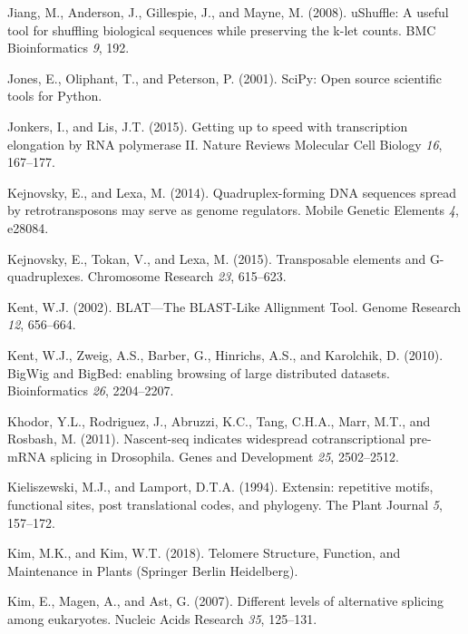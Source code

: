\documentclass[12pt,a4paper,]{report}
\begin{document}
\leavevmode\hypertarget{ref-Jiang2008}{}%
Jiang, M., Anderson, J., Gillespie, J., and Mayne, M. (2008). uShuffle:
A useful tool for shuffling biological sequences while preserving the
k-let counts. BMC Bioinformatics \emph{9}, 192.

\leavevmode\hypertarget{ref-Jones2001}{}%
Jones, E., Oliphant, T., and Peterson, P. (2001). SciPy: Open source
scientific tools for Python.

\leavevmode\hypertarget{ref-Jonkers2015}{}%
Jonkers, I., and Lis, J.T. (2015). Getting up to speed with
transcription elongation by RNA polymerase II. Nature Reviews Molecular
Cell Biology \emph{16}, 167--177.

\leavevmode\hypertarget{ref-Kejnovsky2014}{}%
Kejnovsky, E., and Lexa, M. (2014). Quadruplex-forming DNA sequences
spread by retrotransposons may serve as genome regulators. Mobile
Genetic Elements \emph{4}, e28084.

\leavevmode\hypertarget{ref-Kejnovsky2015}{}%
Kejnovsky, E., Tokan, V., and Lexa, M. (2015). Transposable elements and
G-quadruplexes. Chromosome Research \emph{23}, 615--623.

\leavevmode\hypertarget{ref-Kent2002}{}%
Kent, W.J. (2002). BLAT---The BLAST-Like Allignment Tool. Genome
Research \emph{12}, 656--664.

\leavevmode\hypertarget{ref-Kent2010}{}%
Kent, W.J., Zweig, A.S., Barber, G., Hinrichs, A.S., and Karolchik, D.
(2010). BigWig and BigBed: enabling browsing of large distributed
datasets. Bioinformatics \emph{26}, 2204--2207.

\leavevmode\hypertarget{ref-Khodor2011}{}%
Khodor, Y.L., Rodriguez, J., Abruzzi, K.C., Tang, C.H.A., Marr, M.T.,
and Rosbash, M. (2011). Nascent-seq indicates widespread
cotranscriptional pre-mRNA splicing in Drosophila. Genes and Development
\emph{25}, 2502--2512.

\leavevmode\hypertarget{ref-Kieliszewski1994}{}%
Kieliszewski, M.J., and Lamport, D.T.A. (1994). Extensin: repetitive
motifs, functional sites, post translational codes, and phylogeny. The
Plant Journal \emph{5}, 157--172.

\leavevmode\hypertarget{ref-Kim2018}{}%
Kim, M.K., and Kim, W.T. (2018). Telomere Structure, Function, and
Maintenance in Plants (Springer Berlin Heidelberg).

\leavevmode\hypertarget{ref-Kim2007}{}%
Kim, E., Magen, A., and Ast, G. (2007). Different levels of alternative
splicing among eukaryotes. Nucleic Acids Research \emph{35}, 125--131.
\end{document}
